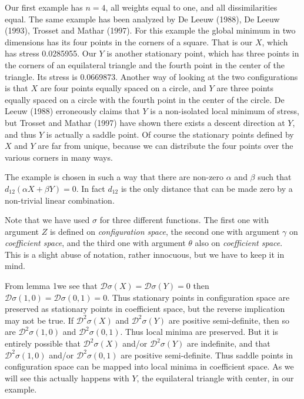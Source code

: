 \documentclass[
  12pt,
]{article}
\begin{document}
Our first example has \(n=4\), all weights equal to one, and all dissimilarities equal. The same example has been analyzed by De Leeuw (1988), De Leeuw (1993), Trosset and Mathar (1997). For this example the global minimum in two dimensions has its four points in the corners of a square. That is our \(X\), which has stress 0.0285955. Our \(Y\) is another stationary point, which has three points in the corners of an equilateral triangle and the fourth point in the center of the triangle. Its stress is 0.0669873. Another way of looking at the two configurations is that \(X\) are four points equally spaced on a circle, and \(Y\) are three points equally spaced on a circle with the fourth point in the center of the circle. De Leeuw (1988) erroneously claims that \(Y\) is a non-isolated local minimum of stress, but Trosset and Mathar (1997) have shown there exists a descent direction at \(Y\), and thus \(Y\) is actually a saddle point. Of course the stationary points defined by \(X\) and \(Y\) are far from unique, because we can distribute the four points over the various corners in many ways.

The example is chosen in such a way that there are non-zero \(\alpha\) and \(\beta\) such that \(d_{12}(\alpha X+\beta Y)=0\). In fact \(d_{12}\) is the only distance that can be made zero by a non-trivial linear combination.

Note that we have used \(\sigma\) for three different functions. The first one with argument \(Z\) is defined on \emph{configuration space}, the second one with argument \(\gamma\) on \emph{coefficient space}, and the third one with argument \(\theta\) also on \emph{coefficient space}. This is a slight abuse of notation, rather innocuous, but we have to keep it in mind.

From lemma 1we see that \(\mathcal{D}\sigma(X)=\mathcal{D}\sigma(Y)=0\) then \(\mathcal{D}\sigma(1,0)=\mathcal{D}\sigma(0,1)=0\). Thus stationary points in configuration space are preserved as stationary points in coefficient space, but the reverse implication may not be true. If \(\mathcal{D}^2\sigma(X)\) and \(\mathcal{D}^2\sigma(Y)\) are positive semi-definite, then so are \(\mathcal{D}^2\sigma(1,0)\) and \(\mathcal{D}^2\sigma(0,1)\). Thus local minima are preserved. But it is entirely possible that \(\mathcal{D}^2\sigma(X)\) and/or \(\mathcal{D}^2\sigma(Y)\) are indefinite, and that \(\mathcal{D}^2\sigma(1,0)\) and/or \(\mathcal{D}^2\sigma(0,1)\) are positive semi-definite.
Thus saddle points in configuration space can be mapped into local minima in coefficient space. As we will see this actually happens with \(Y\), the equilateral triangle with center, in our example.
\end{document}
